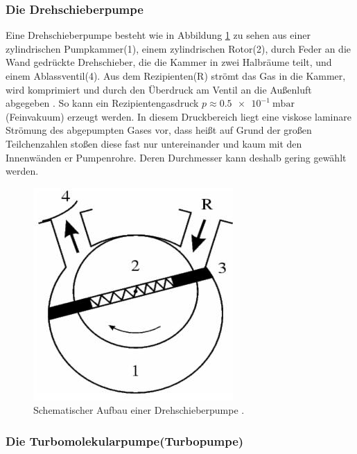 \subsubsection{Die Drehschieberpumpe}

Eine Drehschieberpumpe besteht wie in Abbildung \ref{fig:DSP} zu sehen aus einer zylindrischen Pumpkammer(1), einem zylindrischen Rotor(2), durch Feder an die Wand gedrückte Drehschieber, die die Kammer in zwei Halbräume teilt, und einem Ablassventil(4). Aus dem Rezipienten(R) strömt das Gas in die Kammer, wird komprimiert und durch den Überdruck am Ventil an die Außenluft abgegeben \cite{Jena}.
So kann ein Rezipientengasdruck $p\approx \SI{0,5e-1}{\milli\bar}$ (Feinvakuum) erzeugt werden.
In diesem Druckbereich liegt eine viskose laminare Strömung des abgepumpten Gases vor, dass heißt auf Grund der großen Teilchenzahlen stoßen diese fast nur untereinander und kaum mit den Innenwänden er Pumpenrohre. Deren Durchmesser kann deshalb gering gewählt werden.
\begin{figure}
\centering
\includegraphics[scale=0.5]{content/images/Drehschieber.jpg}
\caption{Schematischer Aufbau einer Drehschieberpumpe \cite{Jena}.}
\label{fig:DSP}
\end{figure}

\subsubsection{Die Turbomolekularpumpe(Turbopumpe)}

